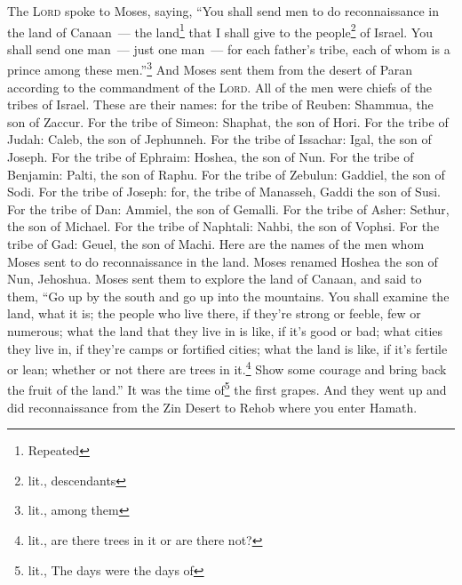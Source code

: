 
\begin{inparaenum}
     The \textsc{Lord} spoke to Moses, saying,%
     ``You shall send men to do reconnaissance in the land of Canaan~--- the land\footnote{Repeated} that I shall give to the people\footnote{lit., descendants} of Israel. You shall send one man~--- just one man~--- for each father's tribe, each of whom is a prince among these men.''\footnote{lit., among them}%
     And Moses sent them from the desert of Paran according to the commandment of the \textsc{Lord}. All of the men were chiefs of the tribes of Israel.%
     These are their names: for the tribe of Reuben: Shammua, the son of Zaccur.%
     For the tribe of Simeon: Shaphat, the son of Hori.%
     For the tribe of Judah: Caleb, the son of Jephunneh.%
     For the tribe of Issachar: Igal, the son of Joseph.%
     For the tribe of Ephraim: Hoshea, the son of Nun.%
     For the tribe of Benjamin: Palti, the son of Raphu.%
     For the tribe of Zebulun: Gaddiel, the son of Sodi.%
     For the tribe of Joseph: for, the tribe of Manasseh, Gaddi the son of Susi.%
     For the tribe of Dan: Ammiel, the son of Gemalli.%
     For the tribe of Asher: Sethur, the son of Michael.%
     For the tribe of Naphtali: Nahbi, the son of Vophsi.%
     For the tribe of Gad: Geuel, the son of Machi.%
     Here are the names of the men whom Moses sent to do reconnaissance in the land. Moses renamed Hoshea the son of Nun, Jehoshua.%
     Moses sent them to explore the land of Canaan, and said to them, ``Go up by the south and go up into the mountains.%
     You shall examine the land, what it is; the people who live there, if they're strong or feeble, few or numerous;%
     what the land that they live in is like, if it's good or bad; what cities they live in, if they're camps or fortified cities;%
     what the land is like, if it's fertile or lean; whether or not there are trees in it.\footnote{lit., are there trees in it or are there not?} Show some courage and bring back the fruit of the land.'' It was the time of\footnote{lit., The days were the days of} the first grapes.%
     And they went up and did reconnaissance from the Zin Desert to Rehob where you enter Hamath.%

\end{inparaenum}
